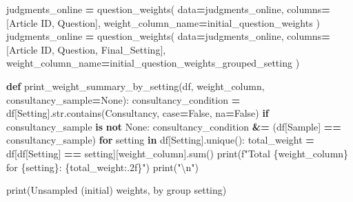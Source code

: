 \documentclass[
]{article}
\newenvironment{Shaded}{\begin{snugshade}}{\end{snugshade}}
\newcommand{\BuiltInTok}[1]{#1}
\newcommand{\CharTok}[1]{\textcolor[rgb]{0.31,0.60,0.02}{#1}}
\newcommand{\ControlFlowTok}[1]{\textcolor[rgb]{0.13,0.29,0.53}{\textbf{#1}}}
\newcommand{\KeywordTok}[1]{\textcolor[rgb]{0.13,0.29,0.53}{\textbf{#1}}}
\newcommand{\NormalTok}[1]{#1}
\newcommand{\OperatorTok}[1]{\textcolor[rgb]{0.81,0.36,0.00}{\textbf{#1}}}
\newcommand{\SpecialCharTok}[1]{\textcolor[rgb]{0.00,0.00,0.00}{#1}}
\newcommand{\SpecialStringTok}[1]{\textcolor[rgb]{0.31,0.60,0.02}{#1}}
\newcommand{\StringTok}[1]{\textcolor[rgb]{0.31,0.60,0.02}{#1}}
\newcommand{\VariableTok}[1]{\textcolor[rgb]{0.00,0.00,0.00}{#1}}
\begin{document}
\begin{Shaded}
\begin{Highlighting}[]
\NormalTok{judgments\_online }\OperatorTok{=}\NormalTok{ question\_weights(}
\NormalTok{    data}\OperatorTok{=}\NormalTok{judgments\_online, }
\NormalTok{    columns}\OperatorTok{=}\NormalTok{[}\StringTok{\textquotesingle{}Article ID\textquotesingle{}}\NormalTok{, }\StringTok{\textquotesingle{}Question\textquotesingle{}}\NormalTok{], }
\NormalTok{    weight\_column\_name}\OperatorTok{=}\StringTok{\textquotesingle{}initial\_question\_weights\textquotesingle{}}
\NormalTok{)}
\NormalTok{judgments\_online }\OperatorTok{=}\NormalTok{ question\_weights(}
\NormalTok{    data}\OperatorTok{=}\NormalTok{judgments\_online, }
\NormalTok{    columns}\OperatorTok{=}\NormalTok{[}\StringTok{\textquotesingle{}Article ID\textquotesingle{}}\NormalTok{, }\StringTok{\textquotesingle{}Question\textquotesingle{}}\NormalTok{, }\StringTok{\textquotesingle{}Final\_Setting\textquotesingle{}}\NormalTok{], }
\NormalTok{    weight\_column\_name}\OperatorTok{=}\StringTok{\textquotesingle{}initial\_question\_weights\_grouped\_setting\textquotesingle{}}
\NormalTok{)}
\end{Highlighting}
\end{Shaded}

\begin{Shaded}
\begin{Highlighting}[]
\KeywordTok{def}\NormalTok{ print\_weight\_summary\_by\_setting(df, weight\_column, consultancy\_sample}\OperatorTok{=}\VariableTok{None}\NormalTok{):}
\NormalTok{    consultancy\_condition }\OperatorTok{=}\NormalTok{ df[}\StringTok{\textquotesingle{}Setting\textquotesingle{}}\NormalTok{].}\BuiltInTok{str}\NormalTok{.contains(}\StringTok{\textquotesingle{}Consultancy\textquotesingle{}}\NormalTok{, case}\OperatorTok{=}\VariableTok{False}\NormalTok{, na}\OperatorTok{=}\VariableTok{False}\NormalTok{)}
    \ControlFlowTok{if}\NormalTok{ consultancy\_sample }\KeywordTok{is} \KeywordTok{not} \VariableTok{None}\NormalTok{:}
\NormalTok{        consultancy\_condition }\OperatorTok{\&=}\NormalTok{ (df[}\StringTok{\textquotesingle{}Sample\textquotesingle{}}\NormalTok{] }\OperatorTok{==}\NormalTok{ consultancy\_sample)}
    \ControlFlowTok{for}\NormalTok{ setting }\KeywordTok{in}\NormalTok{ df[}\StringTok{\textquotesingle{}Setting\textquotesingle{}}\NormalTok{].unique():}
\NormalTok{        total\_weight }\OperatorTok{=}\NormalTok{ df[df[}\StringTok{\textquotesingle{}Setting\textquotesingle{}}\NormalTok{] }\OperatorTok{==}\NormalTok{ setting][weight\_column].}\BuiltInTok{sum}\NormalTok{()}
        \BuiltInTok{print}\NormalTok{(}\SpecialStringTok{f"Total }\SpecialCharTok{\{}\NormalTok{weight\_column}\SpecialCharTok{\}}\SpecialStringTok{ for }\SpecialCharTok{\{}\NormalTok{setting}\SpecialCharTok{\}}\SpecialStringTok{: }\SpecialCharTok{\{}\NormalTok{total\_weight}\SpecialCharTok{:.2f\}}\SpecialStringTok{"}\NormalTok{)}
    \BuiltInTok{print}\NormalTok{(}\StringTok{"}\CharTok{\textbackslash{}n}\StringTok{"}\NormalTok{)}

\BuiltInTok{print}\NormalTok{(}\StringTok{\textquotesingle{}Unsampled (initial) weights, by group setting\textquotesingle{}}\NormalTok{)}
\end{Highlighting}
\end{Shaded}
\end{document}
